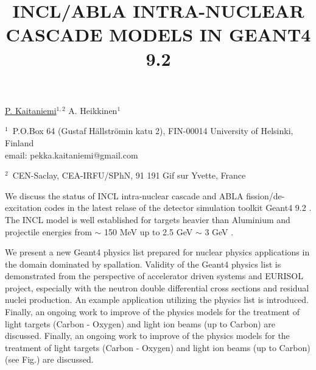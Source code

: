 \documentclass[12pt]{article}
\begin{document}
\title{INCL/ABLA INTRA-NUCLEAR CASCADE MODELS IN GEANT4 9.2}


\underline{P. Kaitaniemi}$^{1, 2}$ A. Heikkinen$^1$ 

$^1$~P.O.Box 64 (Gustaf H\"allstr\"omin katu 2), FIN-00014 University of Helsinki, Finland\\
email: pekka.kaitaniemi@gmail.com

$^2$~CEN-Saclay, CEA-IRFU/SPhN, 91 191 Gif sur Yvette, France


We discuss the status of INCL intra-nuclear cascade and ABLA fission/de-excitation codes
in the latest relase of the detector simulation toolkit Geant4 9.2 \cite{pk09aCollaboration}.
The INCL model is well established for targets heavier than Aluminium
and projectile energies from $\sim$ 150 MeV up to 2.5 GeV $\sim$ 3 GeV \cite{pk08bProceedings}. 

We present a new Geant4 physics list prepared for nuclear physics applications
in the domain dominated by spallation.
Validity of the Geant4 physics list is demonstrated from the perspective of accelerator driven systems
and EURISOL project, especially with the neutron double differential cross sections and residual
nuclei production.
An example application utilizing the physics list is introduced.
%
Finally, an ongoing work to improve of the physics models for the treatment of 
light targets (Carbon - Oxygen) and light ion beams (up to Carbon) are discussed.
Finally, an ongoing work to improve of the physics models for the treatment of 
light targets (Carbon - Oxygen) and light ion beams (up to Carbon) (see Fig.) are discussed.
\end{document}
